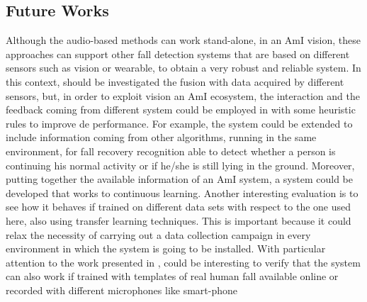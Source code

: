 \subsection{Future Works}
Although the audio-based methods can work stand-alone, in an AmI vision, these approaches can support other fall detection systems that are based on different sensors such as vision or wearable, to obtain a very robust and reliable system.
In this context, should be investigated the fusion with data acquired by different sensors, but, in order to exploit vision an AmI ecosystem, the interaction and the feedback coming from different system could be employed in with some heuristic rules to improve de performance. For example, the system could be extended to include information coming from other algorithms,
running in the same environment, for fall recovery recognition able to detect whether a person is continuing his
normal activity or if he/she is still lying in the ground. Moreover, putting together the available information of an AmI system, a system could be developed that works to continuous learning. 
Another interesting evaluation is to see how it behaves
if trained on different data sets with respect to the one used
here, also using transfer learning techniques. This is important
because it could relax the necessity of carrying out a data
collection campaign in every environment in which the system
is going to be installed. With particular attention to the work presented in , could be interesting to verify that the system can also work if trained with templates of real human fall available online or recorded with different microphones like smart-phone

